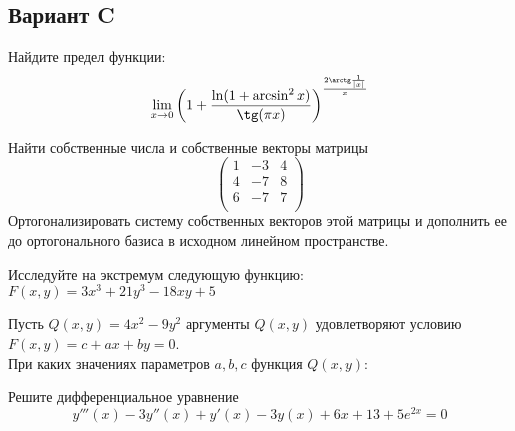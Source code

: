 \documentclass[addpoints, answers]{exam} %
\begin{document}
\subsection{Вариант C}
\begin{questions}

\question Найдите предел функции:
\[\lim_{x\to0}\left( 1+\frac{\ln(1+\arcsin^2x) }{\tg(\pi x) }\right)^{\frac{2\arctg\frac{1}{|x|}}{x}}
\]

\question Найти собственные числа и собственные векторы матрицы
\[\left( \begin{array}{ccc}
1 & -3 & 4\\
4 & -7 & 8 \\
 6 & -7 & 7 \\
\end{array}\right)
\]
Ортогонализировать систему собственных векторов этой матрицы и дополнить ее до ортогонального базиса в исходном линейном пространстве.

\question	Исследуйте на экстремум следующую функцию: $F(x,y)=3x^3+21y^3-18xy+5$

\question Пусть $Q(x,y)=4x^2-9y^2$ аргументы $Q(x,y)$ удовлетворяют условию$F(x,y)=c+ax+by=0$.\\
При каких значениях параметров $a,b,c$ функция $Q(x,y)$:


\question	Решите дифференциальное уравнение
\[
y'''(x)-3y''(x)+y'(x)-3y(x)+6x+13+5e^{2x}=0
\]



\end{questions}
\end{document}
